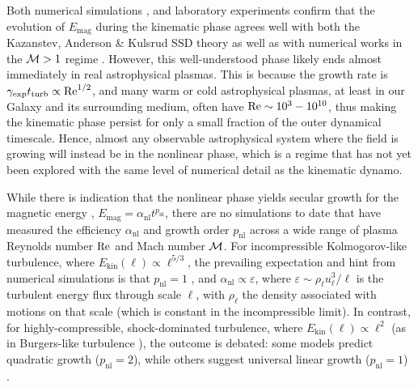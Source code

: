     Both numerical simulations \citep{schekochihin2004simulations, kriel2022fundamental, kriel2025fundamental}, and laboratory experiments \citep{tzeferacos2018laboratory, Bott2021_supersonic_dynamo_in_lab, Bott2021_time_resolved_lab_dynamo} confirm that the evolution of $E_\mathrm{mag}$ during the kinematic phase agrees well with both the Kazanstev, Anderson \& Kulsrud SSD theory \citep{kazantsev1968, kulsrud1992spectrum} as well as with numerical works in the $\mathcal{M} > 1$ regime \citep{Federrath2011_supersonic_dynamo, Federrath2014_supersonic_dynamo, kriel2025fundamental}. However, this well-understood phase likely ends almost immediately in real astrophysical plasmas. This is because the growth rate is $\gamma_\mathrm{exp} t_\mathrm{turb} \propto \mathrm{Re}^{1/2}$, and many warm or cold astrophysical plasmas, at least in our Galaxy and its surrounding medium, often have $\mathrm{Re} \sim 10^3-10^{10}$, thus making the kinematic phase persist for only a small fraction of the outer dynamical timescale. Hence, almost any observable astrophysical system where the field is growing will instead be in the nonlinear phase, which is a regime that has not yet been explored with the same level of numerical detail as the kinematic dynamo.

    While there is indication that the nonlinear phase yields secular growth for the magnetic energy \citep{beresnyak2012universal, cho2009growth, seta2020seed, galishnikova2022tearing, kriel2025fundamental}, $E_\mathrm{mag} = \alpha_\mathrm{nl} t^{p_\mathrm{nl}}$, there are no simulations to date that have measured the efficiency $\alpha_\mathrm{nl}$ and growth order $p_\mathrm{nl}$ across a wide range of plasma Reynolds number $\mathrm{Re}$ and Mach number $\mathcal{M}$. For incompressible Kolmogorov-like turbulence, where $E_\mathrm{kin}(\ell) \propto \ell^{5/3}$, the prevailing expectation and hint from numerical simulations is that $p_\mathrm{nl} = 1$ \citep{kulsrud1992spectrum, schekochihin2002model, cho2009growth, beresnyak2012universal, xu2016turbulent}, and $\alpha_\mathrm{nl} \propto \varepsilon$, where $\varepsilon \sim \rho_\ell u_\ell^3/\ell$ is the turbulent energy flux through scale $\ell$, with $\rho_\ell$ the density associated with motions on that scale (which is constant in the incompressible limit). In contrast, for highly-compressible, shock-dominated turbulence, where $E_\mathrm{kin}(\ell) \propto \ell^2$ (as in Burgers-like turbulence \citep{Federrath2013_universality, Federrath2021_the_sonic_scale, kriel2025fundamental, beattie2025taking}), the outcome is debated: some models \citep{schleicher2013small, schober2015saturation} predict quadratic growth ($p_\mathrm{nl} = 2$), while others suggest universal linear growth ($p_\mathrm{nl} = 1$) \citep{beresnyak2012universal}.

